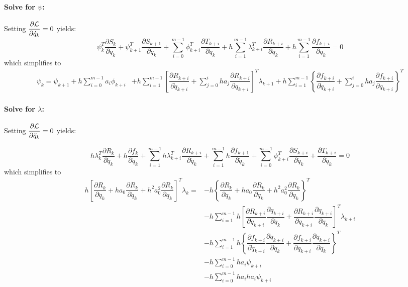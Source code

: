 \documentclass[10pt,letter]{book}
\newcommand{\pd}[2]{\dfrac{\partial #1}{\partial #2}}
\begin{document}
     \paragraph{Solve for $\psi$:}
     Setting $\pd{\cal{L}}{\dot{q}_k} = 0$ yields:
     $$
     \psi_k^T \pd{S_k}{\dot{q}_k} + \psi_{k+1}^T \pd{S_{k+1}}{\dot{q}_k} +
     \sum_{i=0}^{m-1} \phi_{k+i}^T \pd{T_{k+i}}{\dot{q}_k}  + h \sum_{i=1}^{m-1} \lambda_{k+i}^T \pd{R_{k+i}}{\dot{q}_k} 
     + h \sum_{i=1}^{m-1} \pd{f_{k+i}}{\dot{q}_k} = 0
     $$ which simplifies to
     \begin{equation}
       \begin{split}
         \psi_k = \psi_{k+1} + h \sum_{i=0}^{m-1} a_{i} \phi_{k+i} & + h \sum_{i=1}^{m-1}
         \left[ \pd{R_{k+i}}{\dot{q}_{k+i}} + \sum_{j=0}^{i} ha_j \pd{R_{k+i}}{{q}_{k+i}}  \right]^T \lambda_{k+1}
          + h \sum_{i=1}^{m-1}
         \left\{ \pd{f_{k+i}}{\dot{q}_{k+i}} + \sum_{j=0}^{i} ha_j \pd{f_{k+i}}{{q}_{k+i}}  \right\}^T
       \end{split}
     \end{equation}

     \paragraph{Solve for $\lambda$:} Setting $\pd{\cal{L}}{\ddot{q}_k} = 0$ yields:

     $$ h \lambda_k^T \pd{R_k}{\ddot{q}_k} + h \pd{f_k}{\ddot{q}_k} +
     \sum_{i=1}^{m-1} h \lambda_{k+i}^T \pd{R_{k+i}}{\ddot{q}_k} + \sum_{i=1}^{m-1} h
     \pd{f_{k+1}}{\ddot{q}_k} + \sum_{i=0}^{m-1} \psi_{k+i}^T
     \pd{S_{k+i}}{\ddot{q}_k} +
     \pd{T_{k+i}}{\ddot{q}_k}
     =0
     $$
     which simplifies to
     \begin{equation}
       \begin{split}
         h \left[ \pd{R_k}{\ddot{q}_k} + h a_0 \pd{R_k}{\dot{q}_k} +  h^2 a_0^2  \pd{R_k}{{q}_k} \right]^T \lambda_k = & -  h \left\{ \pd{R_k}{\ddot{q}_k} + h a_0 \pd{R_k}{\dot{q}_k} +  h^2 a_0^2  \pd{R_k}{{q}_k} \right\}^T\\
         & - h \sum_{i=1}^{m-1} h \left[ \pd{R_{k+i}}{\dot{q}_{k+i}}\pd{\dot{q}_{k+i}}{\ddot{q}_k} + \pd{R_{k+i}}{q_{k+i}}\pd{q_{k+i}}{\ddot{q}_k} \right]^T \lambda_{k+i}\\
         & - h \sum_{i=1}^{m-1} h \left\{ \pd{f_{k+i}}{\dot{q}_{k+i}}\pd{\dot{q}_{k+i}}{\ddot{q}_k} + \pd{f_{k+i}}{q_{k+i}}\pd{q_{k+i}}{\ddot{q}_k} \right\}^T\\
         & - h \sum_{i=0}^{m-1} ha_i \psi_{k+i}\\
         & - h \sum_{i=0}^{m-1} ha_iha_i \psi_{k+i}
       \end{split}
     \end{equation}
\end{document}
